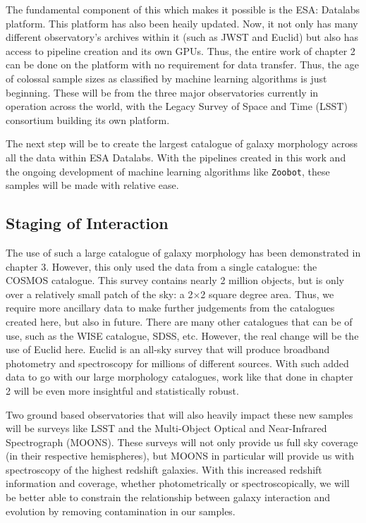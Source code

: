 The fundamental component of this which makes it possible is the ESA: Datalabs platform. This platform has also been heaily updated. Now, it not only has many different observatory's archives within it (such as JWST and Euclid) but also has access to pipeline creation and its own GPUs. Thus, the entire work of chapter 2 can be done on the platform with no requirement for data transfer. Thus, the age of colossal sample sizes as classified by machine learning algorithms is just beginning. These will be from the three major observatories currently in operation across the world, with the Legacy Survey of Space and Time (LSST) consortium building its own platform.

The next step will be to create the largest catalogue of galaxy morphology across all the data within ESA Datalabs. With the pipelines created in this work and the ongoing development of machine learning algorithms like \texttt{Zoobot}, these samples will be made with relative ease.

\subsection{Staging of Interaction}
\noindent The use of such a large catalogue of galaxy morphology has been demonstrated in chapter 3. However, this only used the data from a single catalogue: the COSMOS catalogue. This survey contains nearly 2 million objects, but is only over a relatively small patch of the sky: a 2$\times$2 square degree area. Thus, we require more ancillary data to make further judgements from the catalogues created here, but also in future. There are many other catalogues that can be of use, such as the WISE catalogue, SDSS, etc. However, the real change will be the use of Euclid here. Euclid is an all-sky survey that will produce broadband photometry and spectroscopy for millions of different sources. With such added data to go with our large morphology catalogues, work like that done in chapter 2 will be even more insightful and statistically robust.

Two ground based observatories that will also heavily impact these new samples will be surveys like LSST and the Multi-Object Optical and Near-Infrared Spectrograph (MOONS). These surveys will not only provide us full sky coverage (in their respective hemispheres), but MOONS in particular will provide us with spectroscopy of the highest redshift galaxies. With this increased redshift information and coverage, whether photometrically or spectroscopically, we will be better able to constrain the relationship between galaxy interaction and evolution by removing contamination in our samples. 

